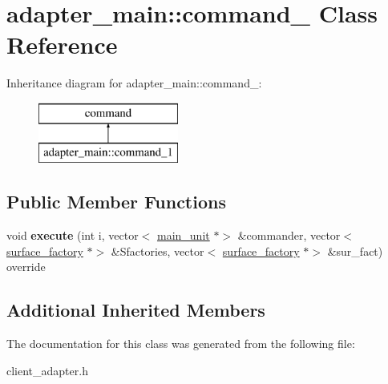 \hypertarget{classadapter__main_1_1command__1}{}\section{adapter\+\_\+main\+:\+:command\+\_ Class Reference}
\label{classadapter__main_1_1command__1}
Inheritance diagram for adapter\+\_\+main\+:\+:command\+\_\+:\begin{figure}[H]
\begin{center}
\leavevmode
\includegraphics[height=2.000000cm]{classadapter__main_1_1command__1}
\end{center}
\end{figure}
\subsection*{Public Member Functions}
\begin{DoxyCompactItemize}
\item 
\mbox{\label{classadapter__main_1_1command__1_a30a0d3a507b6986c4821bc7808abe759}} 
void {\bfseries execute} (int i, vector$<$ \mbox{\hyperlink{classmain__unit}{main\+\_\+unit}} $\ast$$>$ \&commander, vector$<$ \mbox{\hyperlink{classsurface__factory}{surface\+\_\+factory}} $\ast$$>$ \&Sfactories, vector$<$ \mbox{\hyperlink{classsurface__factory}{surface\+\_\+factory}} $\ast$$>$ \&sur\+\_\+fact) override
\end{DoxyCompactItemize}
\subsection*{Additional Inherited Members}


The documentation for this class was generated from the following file\+:\begin{DoxyCompactItemize}
\item 
client\+\_\+adapter.\+h\end{DoxyCompactItemize}
